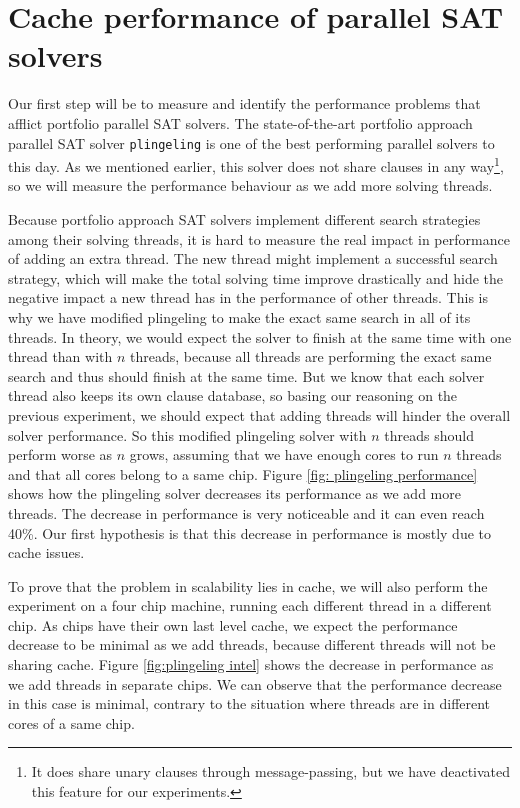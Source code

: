 \documentclass[12pt]{diicc}
\begin{document}
\section{Cache performance of parallel SAT solvers}

Our first step will be to measure and identify the performance problems that afflict portfolio parallel SAT solvers. The state-of-the-art portfolio approach parallel SAT solver \texttt{plingeling} is one of the best performing parallel solvers to this day. As we mentioned earlier, this solver does not share clauses in any way\footnote{It does share unary clauses through message-passing, but we have deactivated this feature for our experiments.}, so we will measure the performance behaviour as we add more solving threads.

Because portfolio approach SAT solvers implement different search strategies among their solving threads, it is hard to measure the real impact in performance of adding an extra thread. The new thread might implement a successful search strategy, which will make the total solving time improve drastically and hide the negative impact a new thread has in the performance of other threads. This is why we have modified plingeling to make the exact same search in all of its threads. In theory, we would expect the solver to finish at the same time with one thread than with $n$ threads, because all threads are performing the exact same search and thus should finish at the same time. But we know that each solver thread also keeps its own clause database, so basing our reasoning on the previous experiment, we should expect that adding threads will hinder the overall solver performance. So this modified plingeling solver with $n$ threads should perform worse as $n$ grows, assuming that we have enough cores to run $n$ threads and that all cores belong to a same chip. Figure \ref{fig: plingeling performance} shows how the plingeling solver decreases its performance as we add more threads. The decrease in performance is very noticeable and it can even reach 40\%. Our first hypothesis is that this decrease in performance is mostly due to cache issues.

To prove that the problem in scalability lies in cache, we will also perform the experiment on a four chip machine, running each different thread in a different chip. As chips have their own last level cache, we expect the performance decrease to be minimal as we add threads, because different threads will not be sharing cache. Figure \ref{fig:plingeling intel} shows the decrease in performance as we add threads in separate chips. We can observe that the performance decrease in this case is minimal, contrary to the situation where threads are in different cores of a same chip. 
\end{document}
